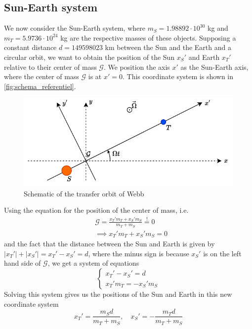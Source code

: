 \subsection{Sun-Earth system}

We now consider the Sun-Earth system, where \(m_S = 1.98892 \cdot 10^{30}\) kg and \(m_T = 5.9736 \cdot 10^{24}\) kg are the respective masses of these objects. Supposing a constant distance \(d = 149598023\) km between the Sun and the Earth and a circular orbit, we want to obtain the position of the Sun \(x_S'\) and Earth \(x_T'\) relative to their center of mass \(\mathcal G\). We position the axis \(x'\) as the Sun-Earth axis, where the center of mass \(\mathcal G\) is at \(x'=0\). This coordinate system is shown in \autoref{fig:schema_referentiel}.
\begin{figure}[h]
    \centering
    \includegraphics[width=0.8\linewidth]{figures/referentiel.pdf}
    \caption{Schematic of the transfer orbit of Webb}
    \label{fig:schema_referentiel}
\end{figure}
Using the equation for the position of the center of mass, i.e.
\begin{equation}
    \begin{aligned}
        &\mathcal G = \frac{x_T' m_T + x_S' m_S}{m_T + m_S} \stackrel{!}{=} 0 \\
        &\implies x_T' m_T + x_S' m_S = 0
    \end{aligned}
\end{equation}
and the fact that the distance between the Sun and Earth is given by \(|x_T'|+|x_S'| = x_T' - x_S' = d\), where the minus sign is because \(x_S'\) is on the left hand side of \(\mathcal G\), we get a system of equations
\begin{equation}
    \begin{cases}
        x_T' - x_S' = d \\
        x_T' m_T = -x_S' m_S
    \end{cases}
\end{equation}
Solving this system gives us the positions of the Sun and Earth in this new coordinate system
\begin{equation}
    x_T' = \frac{m_S d}{m_T + m_S}, \quad x_S' = - \frac{m_T d}{m_T + m_S}
    \label{eq:pos_earth_sun}
\end{equation}

